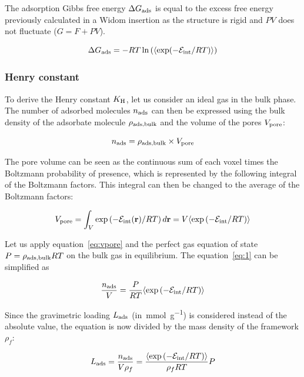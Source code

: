 \documentclass[main.tex]{subfiles}
\begin{document}
The adsorption Gibbs free energy $\Delta G_{\text{ads}}$ is equal to the excess free energy previously calculated in a Widom insertion as the structure is rigid and $PV$ does not fluctuate ($G = F + PV$). 

\begin{equation}\label{eq:ads_gibbs}
  \Delta G_{\text{ads}} = -RT \ln\left(\langle \exp(-\mathcal{E}_{\text{int}}/RT) \rangle\right)
\end{equation}

\subsubsection{Henry constant}

To derive the Henry constant $K_{\text{H}}$, let us consider an ideal gas in the bulk phase. The number of adsorbed molecules $n_{\text{ads}}$ can then be expressed using the bulk density of the adsorbate molecule $\rho_{\text{ads,bulk}}$ and the volume of the pores $V_{\text{pore}}$:

\begin{equation}\label{eq:1}
    n_{\text{ads}} = \rho_{\text{ads,bulk}} \times V_{\text{pore}}  
\end{equation}

The pore volume can be seen as the continuous sum of each voxel times the Boltzmann probability of presence, which is represented by the following integral of the Boltzmann factors. This integral can then be changed to the average of the Boltzmann factors:

\begin{equation}\label{eq:vpore}
    V_{\text{pore}} = \int_V \exp\left(- \mathcal{E}_{\text{int}}(\textbf{r})/RT\right) d\textbf{r} = V \langle \exp\left(-\mathcal{E}_{\text{int}}/RT\right) \rangle
\end{equation}

Let us apply equation~\ref{eq:vpore} and the perfect gas equation of state $P = \rho_{\text{ads,bulk}}RT$ on the bulk gas in equilibrium. The equation~\ref{eq:1} can be simplified as

\begin{equation}
    \dfrac{n_{\text{ads}}}{V} = \dfrac{P}{RT} \langle \exp\left(-\mathcal{E}_{\text{int}}/RT\right) \rangle
\end{equation}

Since the gravimetric loading $L_{\text{ads}}$ (in~\si{\milli\mole\per\gram}) is considered instead of the absolute value, the equation is now divided by the mass density of the framework $\rho_f$:

\begin{equation}
  L_{\text{ads}} = \dfrac{n_{\text{ads}}}{V\rho_f} = \dfrac{\langle \exp\left(-\mathcal{E}_{\text{int}}/RT\right) \rangle}{\rho_f RT} P
\end{equation}
\end{document}
